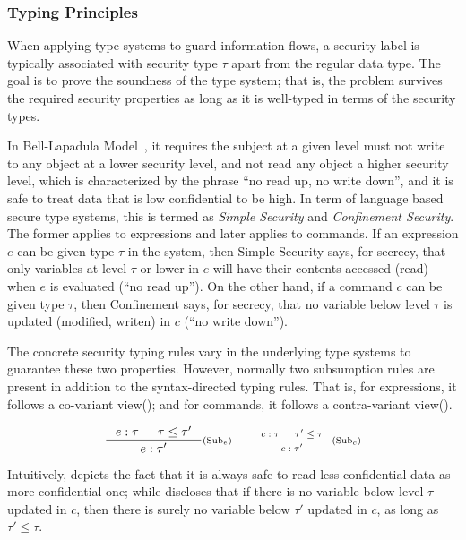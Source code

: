 \subsubsection{Typing Principles}

When applying type systems to guard information flows, a security label is typically associated with security type $\tau$ apart from the regular data type. The goal is to prove the soundness of the type system; that is, the problem survives the required security properties as long as it is well-typed in terms of the security types.

In Bell-Lapadula Model~\cite{bell1973}, it requires the subject at a given level must not write to any object at a lower security level, and not read any object a higher security level, which is characterized by the phrase ``no read up, no write down'', and it is safe to treat data that is low confidential to be high. In term of language based secure type systems, this is termed as \emph{Simple Security} and \emph{Confinement Security}. The former applies to expressions and later applies to commands. If an expression $e$ can be given type $\tau$ in the system, then Simple Security says, for secrecy, that only variables at level $\tau$ or lower in $e$ will have their contents accessed (read) when $e$ is evaluated (``no read up''). On the other hand, if a command $c$ can be given type $\tau$, then Confinement says, for secrecy, that no variable below level $\tau$ is updated (modified, writen) in $c$ (``no write down'').

The concrete security typing rules vary in the underlying type systems to guarantee these two properties. However, normally two subsumption rules are present in addition to the syntax-directed typing rules. That is, for expressions, it follows a co-variant view(); and for commands, it follows a contra-variant view().

\begin{equation*}
\inference
{e:\tau & \tau\leq\tau'}
{e:\tau'}
\ruleTagMath{Sub$_e$}
\qquad
\inference
{c:\tau & \tau'\leq\tau}
{c:\tau'}
\ruleTagMath{Sub$_c$}
\end{equation*}

Intuitively,  depicts the fact that it is always safe to read less confidential data as more confidential one; while  discloses that if there is no variable below level $\tau$ updated in $c$, then there is surely no variable below $\tau'$ updated in $c$, as long as $\tau'\leq\tau$.

